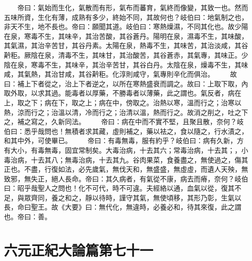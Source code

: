 　　帝曰：氣始而生化，氣散而有形，氣布而蕃育，氣終而像變，其致一也。然而五味所資，生化有薄，成熟有多少，終始不同，其故何也？岐伯曰：地氣制之也，非天不生，地不長也。帝曰：願聞其道。岐伯曰：寒熱燥濕，不同其化也。故少陽在泉，寒毒不生，其味辛，其治苦酸，其谷蒼丹。陽明在泉，濕毒不生，其味酸，其氣濕，其治辛苦甘，其谷丹素。太陽在泉，熱毒不生，其味苦，其治淡咸，其谷黅秬。厥陰在泉，清毒不生，其味甘，其治酸苦，其谷蒼赤，其氣專，其味正。少陰在泉，寒毒不生，其味辛，其治辛苦甘，其谷白丹。太陰在泉，燥毒不生，其味咸，其氣熱，其治甘咸，其谷黅秬。化淳則咸守，氣專則辛化而俱治。
　　故曰：補上下者從之，治上下者逆之，以所在寒熱盛衰而調之。故曰：上取下取，內取外取，以求其過。能毒者以厚藥，不勝毒者以薄藥，此之謂也。氣反者，病在上，取之下；病在下，取之上；病在中，傍取之。治熱以寒，溫而行之；治寒以熱，涼而行之；治溫以清，冷而行之；治清以溫，熱而行之。故消之削之，吐之下之，補之寫之，久新同法。
　　帝曰：病在中而不實不堅，且聚且散，奈何？岐伯曰：悉乎哉問也！無積者求其藏，虛則補之，藥以袪之，食以隨之，行水漬之，和其中外，可使畢已。
　　帝曰：有毒無毒，服有約乎？岐伯曰：病有久新，方有大小，有毒無毒，固宜常制矣。大毒治病，十去其六；常毒治病，十去其；，小毒治病，十去其八；無毒治病，十去其九。谷肉果菜，食養盡之，無使過之，傷其正也。不盡，行復如法，必先歲氣，無伐天和，無盛盛，無虛虛，而遺人天殃，無致邪，無失正，絕人長命。帝曰：其久病者，有氣從不康，病去而瘠，奈何？岐伯曰：昭乎哉聖人之問也！化不可代，時不可違。夫經絡以通，血氣以從，復其不足，與眾齊同，養之和之，靜以待時，謹守其氣，無使頃移，其形乃彰，生氣以長，命曰聖王。故《大要》曰：無代化，無違時，必養必和，待其來復，此之謂也。帝曰：善。


\section{六元正紀大論篇第七十一}

